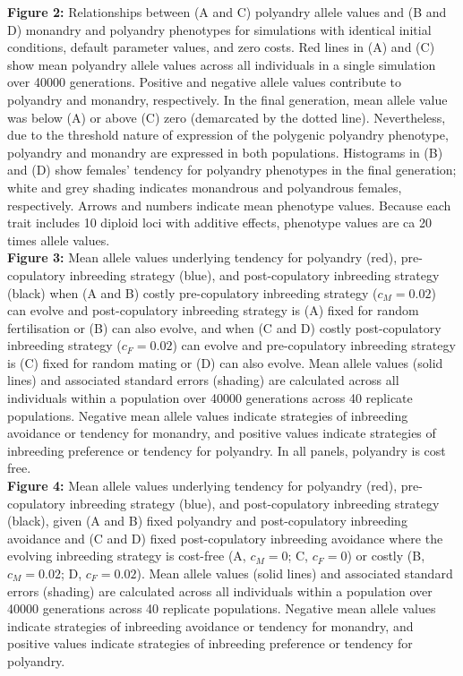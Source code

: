 \documentclass[12pt]{article}
\begin{document}
\noindent \textbf{Figure 2:} Relationships between (A and C) polyandry allele values and (B and D) monandry and polyandry phenotypes for simulations with identical initial conditions, default parameter values, and zero costs. Red lines in (A) and (C) show mean polyandry allele values across all individuals in a single simulation over 40000 generations. Positive and negative allele values contribute to polyandry and monandry, respectively. In the final generation, mean allele value was below (A) or above (C) zero (demarcated by the dotted line). Nevertheless, due to the threshold nature of expression of the polygenic polyandry phenotype, polyandry and monandry are expressed in both populations. Histograms in (B) and (D) show females' tendency for polyandry phenotypes in the final generation; white and grey shading indicates monandrous and polyandrous females, respectively. Arrows and numbers indicate mean phenotype values. Because each trait includes 10 diploid loci with additive effects, phenotype values are ca 20 times allele values. \\

\noindent \textbf{Figure 3:} Mean allele values underlying tendency for polyandry (red), pre-copulatory inbreeding strategy (blue), and post-copulatory inbreeding strategy (black) when (A and B) costly pre-copulatory inbreeding strategy ($c_{M} = 0.02$) can evolve and post-copulatory inbreeding strategy is (A) fixed for random fertilisation or (B) can also evolve, and when (C and D) costly post-copulatory inbreeding strategy ($c_{F} = 0.02$) can evolve and pre-copulatory inbreeding strategy is (C) fixed for random mating or (D) can also evolve. Mean allele values (solid lines) and associated standard errors (shading) are calculated across all individuals within a population over 40000 generations across 40 replicate populations. Negative mean allele values indicate strategies of inbreeding avoidance or tendency for monandry, and positive values indicate strategies of inbreeding preference or tendency for polyandry. In all panels, polyandry is cost free. \\

\noindent \textbf{Figure 4:} Mean allele values underlying tendency for polyandry (red), pre-copulatory inbreeding strategy (blue), and post-copulatory inbreeding strategy (black), given (A and B) fixed polyandry and post-copulatory inbreeding avoidance and (C and D) fixed post-copulatory inbreeding avoidance where the evolving inbreeding strategy is cost-free (A, $c_{M} = 0$; C, $c_{F} = 0$) or costly (B, $c_{M}=0.02$; D, $c_{F}=0.02$). Mean allele values (solid lines) and associated standard errors (shading) are calculated across all individuals within a population over 40000 generations across 40 replicate populations. Negative mean allele values indicate strategies of inbreeding avoidance or tendency for monandry, and positive values indicate strategies of inbreeding preference or tendency for polyandry.
\end{document}
